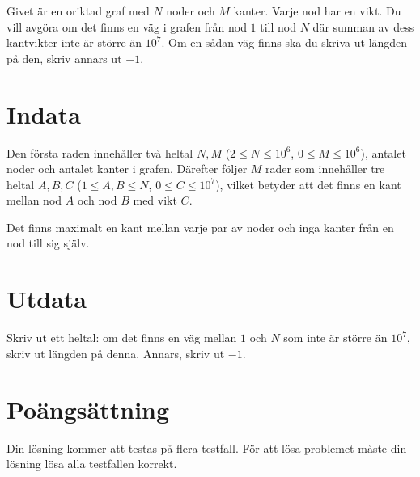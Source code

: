 Givet är en oriktad graf med $N$ noder och $M$ kanter. Varje nod har en vikt. Du vill avgöra om det finns en väg
i grafen från nod $1$ till nod $N$ där summan av dess kantvikter inte är större än $10^7$. Om en sådan väg 
finns ska du skriva ut längden på den, skriv annars ut $-1$.

\section*{Indata}
Den första raden innehåller två heltal $N,M$ ($2 \leq N \leq 10^6$, $0 \leq M \leq 10^6$), antalet noder och antalet kanter i grafen.
Därefter följer $M$ rader som innehåller tre heltal $A,B,C$ ($1 \leq A,B \leq N$, $0 \leq C \leq 10^7$),
vilket betyder att det finns en kant mellan nod $A$ och nod $B$ med vikt $C$.

Det finns maximalt en kant mellan varje par av noder och inga kanter från en nod till sig själv.

\section*{Utdata}
Skriv ut ett heltal: om det finns en väg mellan $1$ och $N$ som inte är större än $10^7$, skriv ut längden på denna.
Annars, skriv ut $-1$.

\section*{Poängsättning}
Din lösning kommer att testas på flera testfall.
\noindent
För att lösa problemet måste din lösning lösa alla testfallen korrekt.
